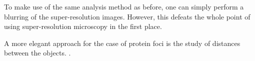     To make use of the same analysis method as before, one can simply perform
    a blurring of the super-resolution images.  However, this defeats the
    whole point of using super-resolution microscopy in the first place.

    A more elegant approach for the case of protein foci is the study of
    distances between the objects.  .
